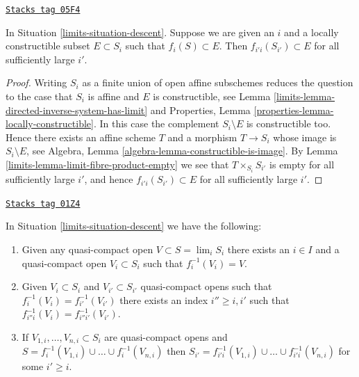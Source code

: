 \begin{lemma}
\label{limits-lemma-limit-contained-in-constructible}
\href{https://stacks.math.columbia.edu/tag/05F4}{\texttt{Stacks tag 05F4}}

In Situation \ref{limits-situation-descent}.
Suppose we are given an $i$ and a locally constructible subset
$E \subset S_i$ such that $f_i(S) \subset E$.
Then $f_{i'i}(S_{i'}) \subset E$ for all sufficiently large $i'$.
\end{lemma}

\begin{proof}

Writing $S_i$ as a finite union of open affine subschemes reduces
the question to the case that $S_i$ is affine and $E$ is constructible, see
Lemma \ref{limits-lemma-directed-inverse-system-has-limit}
and
Properties, Lemma \ref{properties-lemma-locally-constructible}.
In this case the complement $S_i \setminus E$ is constructible too.
Hence there exists an affine scheme $T$ and a morphism $T \to S_i$
whose image is $S_i \setminus E$, see
Algebra, Lemma \ref{algebra-lemma-constructible-is-image}.
By
Lemma \ref{limits-lemma-limit-fibre-product-empty}
we see that $T \times_{S_i} S_{i'}$ is empty for all sufficiently large
$i'$, and hence $f_{i'i}(S_{i'}) \subset E$ for all sufficiently large $i'$.
\end{proof}

\begin{lemma}
\label{limits-lemma-descend-opens}
\href{https://stacks.math.columbia.edu/tag/01Z4}{\texttt{Stacks tag 01Z4}}

In Situation \ref{limits-situation-descent} we have the following:
\begin{enumerate}
\item Given any quasi-compact open $V \subset S = \lim_i S_i$
there exists an $i \in I$ and a quasi-compact open $V_i \subset S_i$
such that $f_i^{-1}(V_i) = V$.
\item Given $V_i \subset S_i$ and $V_{i'} \subset S_{i'}$
quasi-compact opens such that $f_i^{-1}(V_i) = f_{i'}^{-1}(V_{i'})$
there exists an index $i'' \geq i, i'$ such that
$f_{i''i}^{-1}(V_i) = f_{i''i'}^{-1}(V_{i'})$.
\item If $V_{1, i}, \ldots, V_{n, i} \subset S_i$ are quasi-compact
opens and $S = f_i^{-1}(V_{1, i}) \cup \ldots \cup f_i^{-1}(V_{n, i})$
then $S_{i'} = f_{i'i}^{-1}(V_{1, i}) \cup \ldots \cup f_{i'i}^{-1}(V_{n, i})$
for some $i' \geq i$.
\end{enumerate}
\end{lemma}

